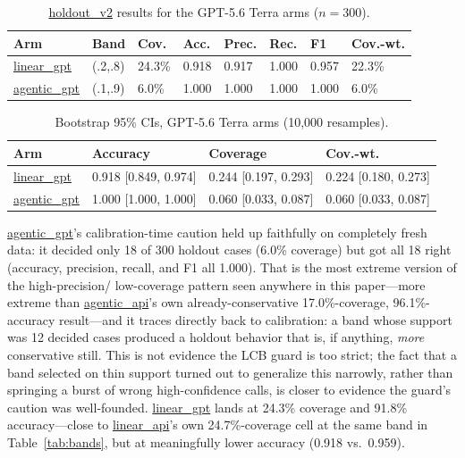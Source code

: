 \documentclass[]{ieeeaccess}
\newcommand{\code}[1]{\url{#1}}
\begin{document}
\begin{table}[H]
\centering
\caption{\code{holdout_v2} results for the GPT-5.6 Terra arms ($n=300$).}\label{tab:gpt}
\scriptsize\setlength{\tabcolsep}{2pt}
\begin{tabularx}{\columnwidth}{@{}lYYYYYYY@{}}
\toprule
\textbf{Arm} & \textbf{Band} & \textbf{Cov.} & \textbf{Acc.} &
\textbf{Prec.} & \textbf{Rec.} & \textbf{F1} & \textbf{Cov.-wt.} \\
\midrule
\code{linear_gpt} & (.2,.8) & 24.3\% & 0.918 & 0.917 & 1.000 & 0.957 & 22.3\% \\
\code{agentic_gpt} & (.1,.9) & 6.0\% & 1.000 & 1.000 & 1.000 & 1.000 & 6.0\% \\
\bottomrule
\end{tabularx}
\end{table}

\begin{table}[H]
\centering
\caption{Bootstrap 95\% CIs, GPT-5.6 Terra arms (10,000 resamples).}\label{tab:gptboot}
\footnotesize
\begin{tabularx}{\columnwidth}{@{}lXXX@{}}
\toprule
\textbf{Arm} & \textbf{Accuracy} & \textbf{Coverage} & \textbf{Cov.-wt.} \\
\midrule
\code{linear_gpt} & 0.918 [0.849, 0.974] & 0.244 [0.197, 0.293] & 0.224 [0.180, 0.273] \\
\code{agentic_gpt} & 1.000 [1.000, 1.000] & 0.060 [0.033, 0.087] & 0.060 [0.033, 0.087] \\
\bottomrule
\end{tabularx}
\end{table}

\code{agentic_gpt}'s calibration-time caution held up faithfully on
completely fresh data: it decided only 18 of 300 holdout cases (6.0\%
coverage) but got all 18 right (accuracy, precision, recall, and F1 all
1.000). That is the most extreme version of the high-precision/%
low-coverage pattern seen anywhere in this paper---more extreme than
\code{agentic_api}'s own already-conservative 17.0\%-coverage,
96.1\%-accuracy result---and it traces directly back to calibration: a
band whose support was 12 decided cases produced a holdout behavior that
is, if anything, \textit{more} conservative still. This is not evidence
the LCB guard is too strict; the fact that a band selected on thin
support turned out to generalize this narrowly, rather than springing
a burst of wrong high-confidence calls, is closer to
evidence the guard's caution was well-founded. \code{linear_gpt} lands at
24.3\% coverage and 91.8\% accuracy---close to \code{linear_api}'s own
24.7\%-coverage cell at the same band in Table~\ref{tab:bands}, but at
meaningfully lower accuracy (0.918 vs.\ 0.959).
\end{document}
